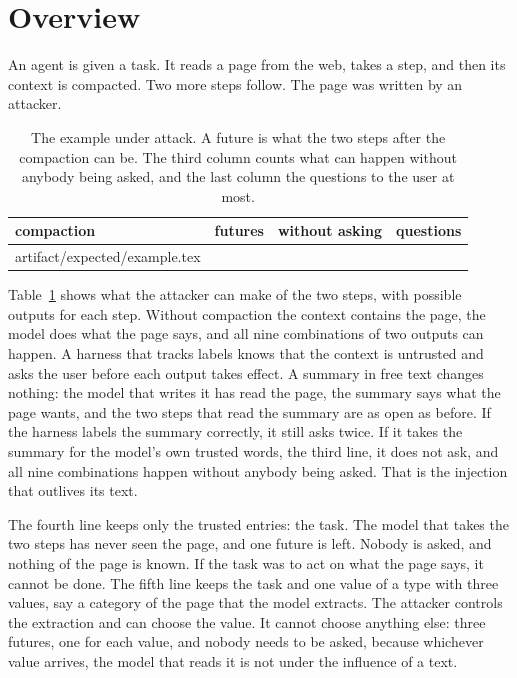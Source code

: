 \documentclass[acmsmall,nonacm,screen]{acmart}
\makeatletter
\newcommand{\claim}[2]{#2}
\newcommand{\rows}[1]{\@@input artifact/expected/#1.tex }
\makeatother
\begin{document}
\section{Overview}
\label{sec:overview}

An agent is given a task. It reads a page from the web, takes a step, and then its context
is compacted. Two more steps follow. The page was written by an attacker.

\begin{table}
\caption{The example under attack. A future is what the two steps after the compaction can
be. The third column counts what can happen without anybody being asked, and the last column
the questions to the user at most.}
\label{tab:example}
\begin{tabular}{lrrr}
\toprule
compaction & futures & without asking & questions \\
\midrule
\rows{example}
\bottomrule
\end{tabular}
\end{table}

\claim{example}{Table~\ref{tab:example} shows what the attacker can make of the two steps,
with \exOutputs{} possible outputs for each step.} Without compaction the context contains
the page, the model does what the page says, and all nine combinations of two outputs can
happen. A harness that tracks labels knows that the context is untrusted and asks the user
before each output takes effect. A summary in free text changes nothing: the model that
writes it has read the page, the summary says what the page wants, and the two steps that
read the summary are as open as before. If the harness labels the summary correctly, it
still asks twice. If it takes the summary for the model's own trusted words, the third line,
it does not ask, and all nine combinations happen without anybody being asked. That is the
injection that outlives its text.

The fourth line keeps only the trusted entries: the task. The model that takes the two steps
has never seen the page, and one future is left. Nobody is asked, and nothing of the page is
known. If the task was to act on what the page says, it cannot be done. The fifth line
keeps the task and one value of a type with three values, say a category of the page that
the model extracts. The attacker controls the extraction and can choose the value. It cannot
choose anything else: three futures, one for each value, and nobody needs to be asked,
because whichever value arrives, the model that reads it is not under the influence of a
text.
\end{document}
